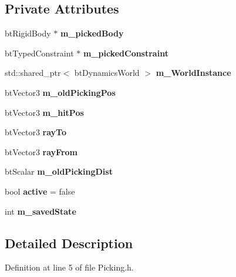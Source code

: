 \subsection*{Private Attributes}
\begin{DoxyCompactItemize}
\item 
bt\+Rigid\+Body $\ast$ {\bfseries m\+\_\+picked\+Body}\hypertarget{class_pick_a640524537ad8866cad42d791712073e9}{}\label{class_pick_a640524537ad8866cad42d791712073e9}

\item 
bt\+Typed\+Constraint $\ast$ {\bfseries m\+\_\+picked\+Constraint}\hypertarget{class_pick_ad3ac277f4f6bf7028e4e4cc6b4e5ed44}{}\label{class_pick_ad3ac277f4f6bf7028e4e4cc6b4e5ed44}

\item 
std\+::shared\+\_\+ptr$<$ bt\+Dynamics\+World $>$ {\bfseries m\+\_\+\+World\+Instance}\hypertarget{class_pick_a3cc97bc163dbb5f33ca020a9ef6464f0}{}\label{class_pick_a3cc97bc163dbb5f33ca020a9ef6464f0}

\item 
bt\+Vector3 {\bfseries m\+\_\+old\+Picking\+Pos}\hypertarget{class_pick_ab148cbd9ea670c825b5230bc0e1b6841}{}\label{class_pick_ab148cbd9ea670c825b5230bc0e1b6841}

\item 
bt\+Vector3 {\bfseries m\+\_\+hit\+Pos}\hypertarget{class_pick_aaee856eff43f0f5cff51747f6a3667b1}{}\label{class_pick_aaee856eff43f0f5cff51747f6a3667b1}

\item 
bt\+Vector3 {\bfseries ray\+To}\hypertarget{class_pick_a915354f02bf5c91c9a63e02d8dec34d6}{}\label{class_pick_a915354f02bf5c91c9a63e02d8dec34d6}

\item 
bt\+Vector3 {\bfseries ray\+From}\hypertarget{class_pick_aebe71781593209a8bc0e6005649ebdf5}{}\label{class_pick_aebe71781593209a8bc0e6005649ebdf5}

\item 
bt\+Scalar {\bfseries m\+\_\+old\+Picking\+Dist}\hypertarget{class_pick_a8be687cbe529ee04d2cb5083aa4adad5}{}\label{class_pick_a8be687cbe529ee04d2cb5083aa4adad5}

\item 
bool {\bfseries active} = false\hypertarget{class_pick_a3c6cb297bbd998e04362e14f678f050d}{}\label{class_pick_a3c6cb297bbd998e04362e14f678f050d}

\item 
int {\bfseries m\+\_\+saved\+State}\hypertarget{class_pick_a2438da4770eed066cde8e48dd178194b}{}\label{class_pick_a2438da4770eed066cde8e48dd178194b}

\end{DoxyCompactItemize}


\subsection{Detailed Description}


Definition at line 5 of file Picking.\+h.

